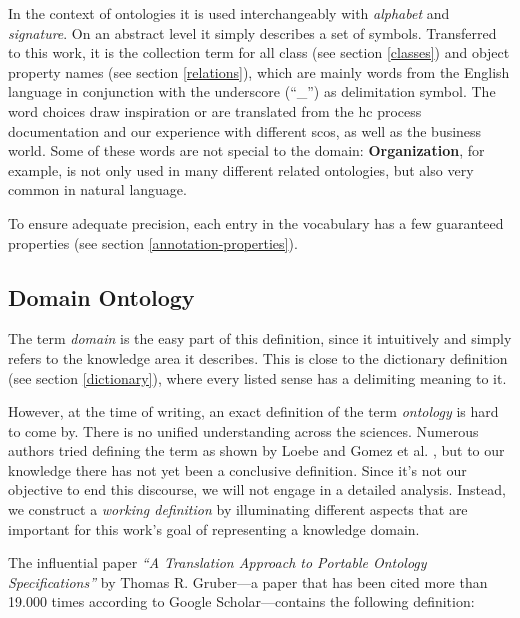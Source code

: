 \documentclass[a4paper, DIV=13, BCOR=0cm]{scrbook}
\begin{document}
In the context of ontologies it is used interchangeably with \textit{alphabet} and \textit{signature}. On an abstract level it simply describes a set of symbols. \cite[p.\,46]{loebe2015ontological} Transferred to this work, it is the collection term for all class (see section \ref{classes}) and object property names (see section \ref{relations}), which are mainly words from the English language in conjunction with the underscore (\enquote{\_}) as delimitation symbol. The word choices draw inspiration or are translated from the \gls{hc} process documentation and our experience with different \glspl{sco}, as well as the business world. Some of these words are not special to the domain: \textbf{Organization}, for example, is not only used in many different related ontologies, but also very common in natural language.

To ensure adequate precision, each entry in the vocabulary has a few guaranteed properties (see section \ref{annotation-properties}).

\subsection{Domain Ontology}
The term \textit{domain} is the easy part of this definition, since it intuitively and simply refers to the knowledge area it describes. \cite[p.\,7]{loebe2015ontological} This is close to the dictionary definition (see section \ref{dictionary}), where every listed sense has a delimiting meaning to it. \cite{mw-dictionary}

However, at the time of writing, an exact definition of the term \textit{ontology} is hard to come by. There is no unified understanding across the sciences. \cite{Hesse_2014} Numerous authors tried defining the term as shown by Loebe \cite[p.\,4-6]{loebe2015ontological} and Gomez et al. \cite[p.\, 6--9]{Gomez-Perez:2004aa}, but to our knowledge there has not yet been a conclusive definition. Since it's not our objective to end this discourse, we will not engage in a detailed analysis. Instead, we construct a \textit{working definition} by illuminating different aspects that are important for this work's goal of representing a knowledge domain.

The influential paper \cite[p.\,9]{schulz2012guideline} \cite[p.\,4]{loebe2015ontological} \textit{\enquote{A Translation Approach to Portable Ontology Specifications}} by Thomas R. Gruber---a paper that has been cited more than 19.000 times according to Google Scholar---contains the following definition:
\end{document}
